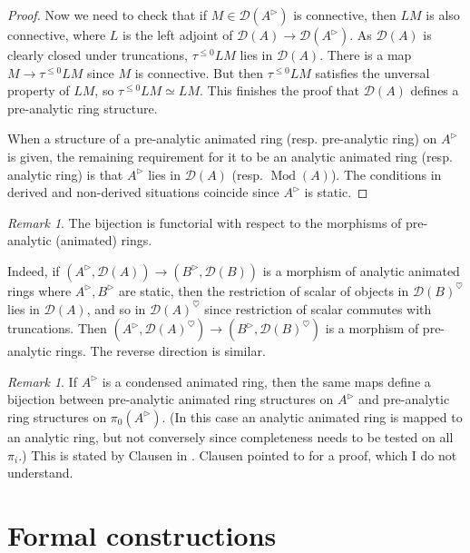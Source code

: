 \documentclass{article}
\theoremstyle{plain}
\theoremstyle{definition}
\theoremstyle{remark}
\newtheorem{rmk}[thm]{Remark}
\DeclareMathOperator{\modcat}{Mod}
\newcommand{\huflag}{\triangleright}
\newcommand{\D}{\mathcal{D}}
\newcommand{\heart}{\heartsuit}
\newcommand{\resp}[1]{{\color{respcolor}(resp. #1)}}
\begin{document}
\begin{proof}
Now we need to check that if $ M\in \D (A ^{\huflag}) $ is connective, then $ LM $ is also connective, where $ L $ is the left adjoint
of $ \D (A)\to \D (A ^{\huflag}) $.
As $ \D (A) $ is clearly closed under truncations, $ \tau ^{\leq 0} L M $ lies in $ \D (A) $.
There is a map $ M\to \tau ^{\leq 0}LM $ since $ M $ is connective.
But then $ \tau ^{\leq 0}LM $ satisfies the unversal property of $ LM $,
so $ \tau ^{\leq 0}LM\simeq LM $.
This finishes the proof that $ \D (A) $ defines a pre-analytic ring structure.

When a structure of a pre-analytic animated ring \resp{pre-analytic ring} on $ A ^{\huflag} $ is given,
the remaining requirement for it to be an analytic animated ring \resp{analytic ring} is that $ A ^{\huflag} $ lies in
$ \D (A) $ \resp{$ \modcat (A) $}. The conditions in derived and non-derived situations coincide since $ A ^{\huflag} $ is static.
\end{proof}

\begin{rmk}
The bijection is functorial with respect to the morphisms of pre-analytic (animated) rings.

Indeed, if $ (A ^{\huflag}, \D (A))\to (B ^{\huflag}, \D (B)) $ is a morphism of analytic animated rings
where $ A ^{\huflag}, B ^{\huflag} $ are static,
then the restriction of scalar of objects in $ \D (B) ^{\heart} $ lies in $ \D (A) $,
and so in $ \D (A)^{\heart} $ since restriction of scalar commutes with truncations.
Then $ (A ^{\huflag}, \D (A)^{\heart})\to (B ^{\huflag}, \D (B)^{\heart}) $ is a morphism of pre-analytic rings.
The reverse direction is similar.
\end{rmk}

\begin{rmk}
If $ A ^{\huflag} $ is a condensed animated ring, then the same maps define a bijection between pre-analytic animated ring structures on
$ A ^{\huflag} $ and pre-analytic ring structures on $ \pi _{0}(A ^{\huflag}) $.
(In this case an analytic animated ring is mapped to an analytic ring, but not conversely since completeness needs to be tested on all $ \pi _{i} $.)
This is stated by Clausen in
\cite[\href{https://www.youtube.com/watch?v=38PzTzCiMow\&list=PLx5f8IelFRgGmu6gmL-Kf\_Rl\_6Mm7juZO\&index=13\&t=2099s}{Video 13, 34:59}]{ihesvid}.
Clausen pointed to \cite{analytic} for a proof, which I do not understand.
\label{definition::animated}
\end{rmk}

\section{Formal constructions}
\end{document}
